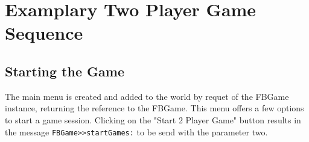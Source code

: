 \section{Examplary Two Player Game Sequence}
\subsection{Starting the Game}
The main menu is created and added to the world by requet of the FBGame instance,
returning the reference to the FBGame. This menu offers a few options to start 
a game session. Clicking on the "Start 2 Player Game" button results in the message
\lstinline!FBGame>>startGames:! to be send with the parameter two.

